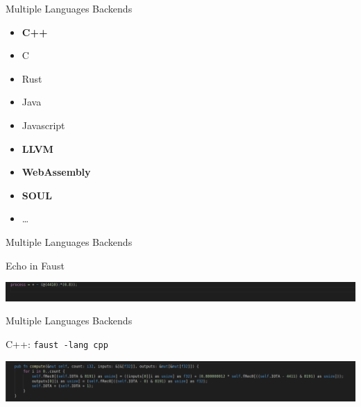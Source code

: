 
\begin{frame}[fragile]{Multiple Languages Backends}
    \begin{itemize}
        \item \textbf{C++}
        \item C
        \item Rust
        \item Java
        \item Javascript
        \item \textbf{LLVM}
        \item \textbf{WebAssembly}
        \item \textbf{SOUL}
        \item \ldots
    \end{itemize}
\end{frame}


\begin{frame}[fragile]{Multiple Languages Backends}
    \begin{block}{Echo in Faust}
        \begin{center}
            \includegraphics[width=\textwidth,keepaspectratio=true]{images/echo-faust.png}
        \end{center}
    \end{block}
\end{frame}



\begin{frame}[fragile]{Multiple Languages Backends}

    \begin{block}{C++: \lstinline'faust -lang cpp'}
        \begin{center}
            \includegraphics[width=\textwidth,keepaspectratio=true]{images/echo-cpp.png}
        \end{center}
    \end{block}
\end{frame}


